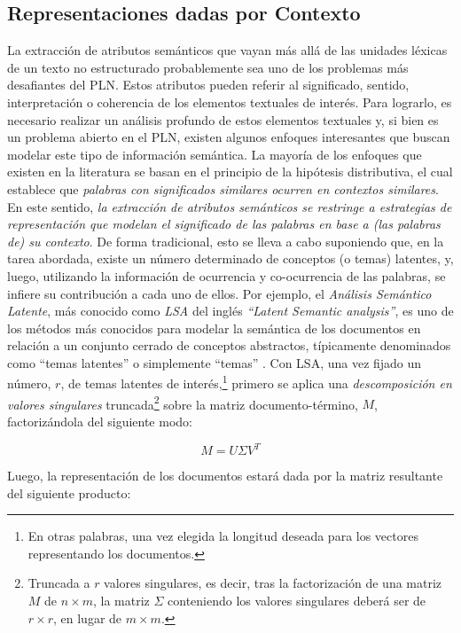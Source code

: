 \subsection{Representaciones dadas por Contexto}

La extracción de atributos semánticos que vayan más allá de las unidades léxicas de un texto no estructurado probablemente sea uno de los problemas más desafiantes del \acf{PLN}.
Estos atributos pueden referir al significado, sentido, interpretación o coherencia de los elementos textuales de interés.
Para lograrlo, es necesario realizar un análisis profundo de estos elementos textuales y, si bien es un problema abierto en el \ac{PLN}, existen algunos enfoques interesantes que buscan modelar este tipo de información semántica.
La mayoría de los enfoques que existen en la literatura se basan en el principio de la hipótesis distributiva, el cual establece que \emph{palabras con significados similares ocurren en contextos similares}\cite{sahlgren2008distributional}.
En este sentido, \emph{la extracción de atributos semánticos se restringe a estrategias de representación que modelan el significado de las palabras en base a (las palabras de) su contexto}.
De forma tradicional, esto se lleva a cabo suponiendo que, en la tarea abordada, existe un número determinado de conceptos (o temas) latentes, y, luego, utilizando la información de ocurrencia y co-ocurrencia de las palabras, se infiere su contribución a cada uno de ellos\cite{lavelli2004distributional}.
Por ejemplo, el \emph{Análisis Semántico Latente}, más conocido como \emph{LSA} del inglés \emph{``Latent Semantic analysis''}, es uno de los métodos más conocidos para modelar la semántica de los documentos en relación a un conjunto cerrado de conceptos abstractos, típicamente denominados como ``temas latentes'' o simplemente ``temas'' \cite{deerwester1990indexing, dumais2004latent}.
Con LSA, una vez fijado un número, $r$, de temas latentes de interés,\footnote{En otras palabras, una vez elegida la longitud deseada para los vectores representando los documentos.} primero se aplica una \emph{descomposición en valores singulares} truncada\footnote{Truncada a $r$ valores singulares, es decir, tras la factorización de una matriz $M$ de $n \times m$, la matriz $\Sigma$ conteniendo los valores singulares deberá ser de $r \times r$, en lugar de $m \times m$.} sobre la matriz documento-término, $M$, factorizándola del siguiente modo:

$$M=U\Sigma V^T$$

Luego, la representación de los documentos estará dada por la matriz resultante del siguiente producto:

